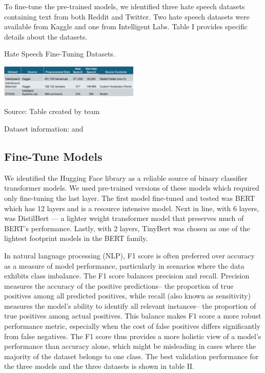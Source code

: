 \documentclass[conference]{IEEEtran}
\begin{document}
To fine-tune the pre-trained models, we identified three hate speech datasets containing text from both Reddit and Twitter. Two hate speech datasets were available from Kaggle\cite{b8} and one from Intelligent Labs\cite{b9}. Table I provides specific details about the datasets.

\begin{table}[h!]
  \caption{Hate Speech Fine-Tuning Datasets.}
  \label{tab:datasets}
  \centering\includegraphics[width=0.5\textwidth]{tabledatasets.png}
  \caption*{Source: Table created by team}
  \caption*{Dataset information: \cite{b8} and \cite{b9}}
\end{table}

\subsection{Fine-Tune Models}
We identified the Hugging Face library\cite{b18} as a reliable source of binary classifier transformer models. We used pre-trained versions of these models which required only fine-tuning the last layer. The first model fine-tuned and tested was BERT which has 12 layers and is  a resource intensive model. Next in line, with 6 layers, was DistilBert --- a lighter weight transformer model that preserves much of BERT's performance\cite{b16}. Lastly, with 2 layers, TinyBert was chosen as one of the lightest footprint models in the BERT family.

In natural language processing (NLP), F1 score is often preferred over accuracy as a measure of model performance, particularly in scenarios where the data exhibits class imbalance. The F1 score balances precision and recall. Precision measures the accuracy of the positive predictions-- the proportion of true positives among all predicted positives, while recall (also known as sensitivity) measures the model's ability to identify all relevant instances-- the proportion of true positives among actual positives\cite{b19}. This balance makes F1 score a more robust performance metric, especially when the cost of false positives differs significantly from false negatives. The F1 score thus provides a more holistic view of a model's performance than accuracy alone, which might be misleading in cases where the majority of the dataset belongs to one class\cite{b19}. The best validation performance for the three models and the three datasets is shown in table II.
\end{document}
